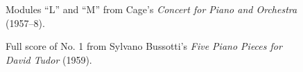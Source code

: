     \begin{figure}
        \centering
        
            \vspace{10pt}
            
        \captionsetup{width=.5\textwidth}
        \caption[Modules ``L'' and ``M'' from the piano solo of Cage's \textit{Concert for Piano and Orchestra} (1957--8).]{Modules ``L'' and ``M'' from Cage's \textit{Concert for Piano and Orchestra} (1957--8).\footnotemark}
        \label{fig:cagepiano1}
    \end{figure}

    \begin{figure}
        \centering
        \captionsetup{width=.5\textwidth}
        \caption[Full score of No. 1 from Sylvano Bussotti's \textit{Five Piano Pieces for David Tudor} (1959).]{Full score of No. 1 from Sylvano Bussotti's \textit{Five Piano Pieces for David Tudor} (1959).\footnotemark}
        \label{fig:bussottipiano1}
    \end{figure}

